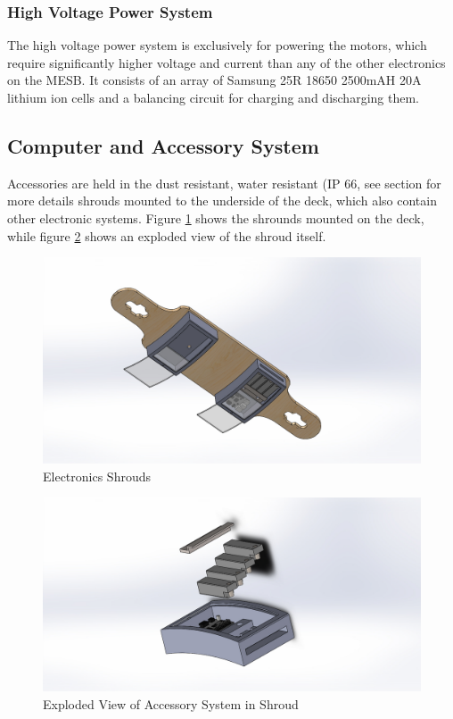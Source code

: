 \documentclass[letterpaper,12pt]{article}
\begin{document}
\subsubsection{High Voltage Power System}
The high voltage power system is exclusively for powering the motors, which require significantly higher voltage and current than any of the other electronics on the MESB. It consists of an array of Samsung 25R 18650 2500mAH 20A lithium ion cells and a balancing circuit for charging and discharging them.
\subsection{Computer and Accessory System}
Accessories are held in the dust resistant, water resistant (IP 66, see section for more details shrouds mounted to the underside of the deck, which also contain other electronic systems. Figure \ref{access-full} shows the shrounds mounted on the deck, while figure \ref{access-expl} shows an exploded view of the shroud itself.

\begin{figure}
  \centering
  \includegraphics[width=.7\linewidth]{ModularAssembledBottomAngle}
  \caption{Electronics Shrouds}
  \label{access-full}
\end{figure}

\begin{figure}\centering
  \includegraphics[width=.7\linewidth]{ModPieceAngleExtend}
  \caption{Exploded View of Accessory System in Shroud}
  \label{access-expl}
\end{figure}
\end{document}
